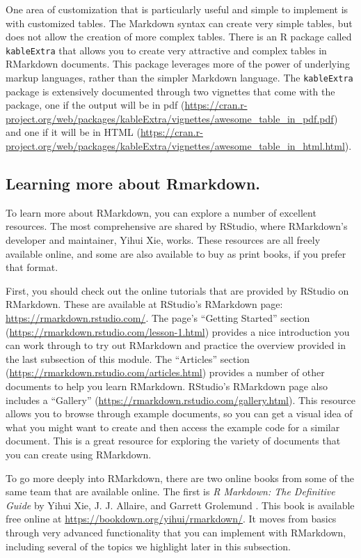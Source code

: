 \documentclass[]{tufte-book}
\begin{document}
One area of customization that is particularly useful and simple to implement is
with customized tables. The Markdown syntax can create very simple tables, but
does not allow the creation of more complex tables. There is an R package called
\texttt{kableExtra} that allows you to create very attractive and complex tables
in RMarkdown documents.
This package leverages more of the power of underlying markup languages, rather
than the simpler Markdown language.
The
\texttt{kableExtra} package is extensively documented through two vignettes that come
with the package, one if the output will be in pdf
(\url{https://cran.r-project.org/web/packages/kableExtra/vignettes/awesome_table_in_pdf.pdf})
and one if it will be in HTML
(\url{https://cran.r-project.org/web/packages/kableExtra/vignettes/awesome_table_in_html.html}).

\subsection{Learning more about Rmarkdown.}\label{learning-more-about-rmarkdown.}

To learn more about RMarkdown, you can explore a number of excellent resources.
The most comprehensive are shared by RStudio, where RMarkdown's developer
and maintainer, Yihui Xie, works. These resources are all freely available
online, and some are also available to buy as print books, if you prefer that
format.

First, you should check out the online tutorials that are provided by RStudio on
RMarkdown. These are available at RStudio's RMarkdown page:
\url{https://rmarkdown.rstudio.com/}. The page's ``Getting Started'' section
(\url{https://rmarkdown.rstudio.com/lesson-1.html}) provides a nice introduction you
can work through to try out RMarkdown and practice the overview provided in the
last subsection of this module. The ``Articles'' section
(\url{https://rmarkdown.rstudio.com/articles.html}) provides a number of other
documents to help you learn RMarkdown. RStudio's RMarkdown page also includes a
``Gallery'' (\url{https://rmarkdown.rstudio.com/gallery.html}). This resource allows you
to browse through example documents, so you can get a visual idea of what you
might want to create and then access the example code for a similar document.
This is a great resource for exploring the variety of documents that you can
create using RMarkdown.

To go more deeply into RMarkdown, there are two online books from some of the
same team that are available online. The first is \emph{R Markdown: The Definitive
Guide} by Yihui Xie, J. J. Allaire, and Garrett Grolemund \citep{xie2018r}. This book is
available free online at \url{https://bookdown.org/yihui/rmarkdown/}. It moves from
basics through very advanced functionality that you can implement with
RMarkdown, including several of the topics we highlight later in this
subsection.
\end{document}

